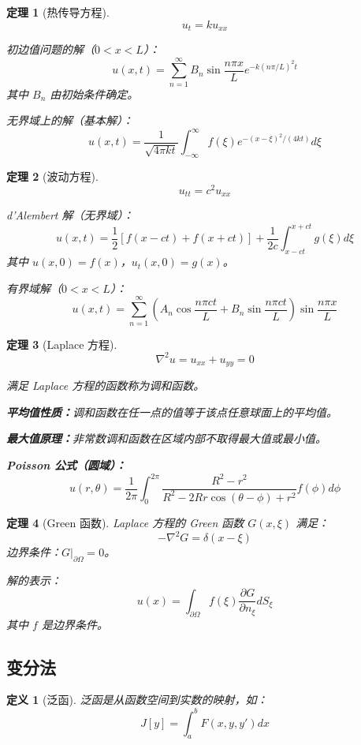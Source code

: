 \documentclass[12pt]{article}
\newtheorem{theorem}{定理}[section]
\newtheorem{definition}{定义}[section]
\begin{document}
\begin{theorem}[热传导方程]
$$u_t = k u_{xx}$$

初边值问题的解（$0 < x < L$）：
$$u(x, t) = \sum_{n=1}^{\infty} B_n \sin\frac{n\pi x}{L} e^{-k(n\pi/L)^2 t}$$
其中 $B_n$ 由初始条件确定。

无界域上的解（基本解）：
$$u(x, t) = \frac{1}{\sqrt{4\pi kt}} \int_{-\infty}^{\infty} f(\xi) e^{-(x-\xi)^2/(4kt)} d\xi$$
\end{theorem}

\begin{theorem}[波动方程]
$$u_{tt} = c^2 u_{xx}$$

d'Alembert 解（无界域）：
$$u(x, t) = \frac{1}{2}[f(x - ct) + f(x + ct)] + \frac{1}{2c}\int_{x-ct}^{x+ct} g(\xi) d\xi$$
其中 $u(x, 0) = f(x)$，$u_t(x, 0) = g(x)$。

有界域解（$0 < x < L$）：
$$u(x, t) = \sum_{n=1}^{\infty} \left(A_n \cos\frac{n\pi ct}{L} + B_n \sin\frac{n\pi ct}{L}\right) \sin\frac{n\pi x}{L}$$
\end{theorem}

\begin{theorem}[Laplace 方程]
$$\nabla^2 u = u_{xx} + u_{yy} = 0$$

满足 Laplace 方程的函数称为调和函数。

\textbf{平均值性质：}调和函数在任一点的值等于该点任意球面上的平均值。

\textbf{最大值原理：}非常数调和函数在区域内部不取得最大值或最小值。

\textbf{Poisson 公式（圆域）：}
$$u(r, \theta) = \frac{1}{2\pi} \int_0^{2\pi} \frac{R^2 - r^2}{R^2 - 2Rr\cos(\theta - \phi) + r^2} f(\phi) d\phi$$
\end{theorem}

\begin{theorem}[Green 函数]
Laplace 方程的 Green 函数 $G(x, \xi)$ 满足：
$$-\nabla^2 G = \delta(x - \xi)$$
边界条件：$G|_{\partial\Omega} = 0$。

解的表示：
$$u(x) = \int_{\partial\Omega} f(\xi) \frac{\partial G}{\partial n_\xi} dS_\xi$$
其中 $f$ 是边界条件。
\end{theorem}

\subsection{变分法}

\begin{definition}[泛函]
泛函是从函数空间到实数的映射，如：
$$J[y] = \int_a^b F(x, y, y') dx$$
\end{definition}
\end{document}
